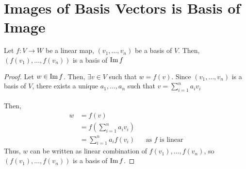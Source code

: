 \documentclass[letterpaper,12pt]{article}
\begin{document}
\section*{Images of Basis Vectors is Basis of Image}
\begin{theorem}
Let $f: V \rightarrow W$ be a linear map, $(v_1, \dots, v_n)$ be a basis of $V$. Then, $(f(v_1), \dots, f(v_n))$ is a basis of $\operatorname{Im}{f}$
\end{theorem}
\begin{proof}
Let $w \in \operatorname{Im}{f}$. Then, $\exists v \in V$ such that $w = f(v)$. Since $(v_1, \dots, v_n)$ is a basis of $V$, there exists a unique $a_1, \dots, a_n$ such that $v = \sum_{i=1}^n a_i v_i$
\\ \\ Then,
\begin{align*}
    w & = f(v) \\
    & = f\left(\sum_{i=1}^n a_i v_i \right) \\
    & = \sum_{i=1}^n a_i f(v_i) && \text{as $f$ is linear}
\end{align*}
Thus, $w$ can be written as linear combination of $f(v_1), \dots, f(v_n)$, so $(f(v_1), \dots, f(v_n))$ is a basis of $\operatorname{Im}{f}$.
\end{proof}
\end{document}
